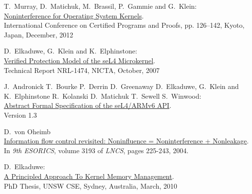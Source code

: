 \documentclass[pdftex,11pt,a4paper]{article}
\begin{document}
	\begin{thebibliography}{99}

	T.\ Murray, D.\ Matichuk, M.\ Brassil, P.\ Gammie and G.\ Klein:	\\ 
	\href{http://www.ssrg.nicta.com/publications/nicta_full_text/6004.pdf}{%
		Noninterference for Operating System Kernels}. \\
    International Conference on Certified Programs and Proofs, pp. 126–142, Kyoto, Japan, December, 2012

	D.\ Elkaduwe, G.\ Klein and K.\ Elphinstone:	\\ 
	\href{http://ts.data61.csiro.au/publications/nicta_full_text/1474.pdf}{%
		Verified Protection Model of the seL4 Microkernel}. \\
   	Technical Report NRL-1474, NICTA, October, 2007
   	
	J.\ Andronick T.\ Bourke P.\ Derrin D.\ Greenaway D.\ Elkaduwe, G.\ Klein and K.\ Elphinstone R.\ Kolanski D.\ Matichuk T.\ Sewell S.\ Winwood:	\\ 
	\href{https://sel4.systems/Info/Docs/seL4-spec.pdf}{%
		Abstract Formal Specification of the seL4/ARMv6 API}. \\
   	Version 1.3
   	
	D.\ von Oheimb	\\ 
	\href{https://pdfs.semanticscholar.org/21ea/6c722535ed0a22175187796b43c114e14ee8.pdf}{%
		Information flow control revisited: Noninfluence = Noninterference + Nonleakage}. \\
   	In \textit{9th ESORICS}, volume 3193 of \textit{LNCS}, pages 225-243, 2004.
   	
	D.\ Elkaduwe:	\\ 
	\href{https://ts.data61.csiro.au/publications/papers/Elkaduwe:phd.pdf}{%
		A Principled Approach To Kernel Memory Management}. \\
   	PhD Thesis, UNSW CSE, Sydney, Australia, March, 2010

\end{thebibliography}
	
\end{document}
